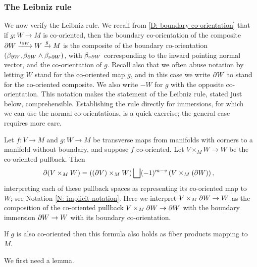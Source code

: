 \subsubsection{The Leibniz rule}

We now verify the Leibniz rule.
We recall from \cref{D: boundary co-orientation} that if $g \colon W \to M$ is co-oriented, then the boundary co-orientation of the composite $\partial W \xrightarrow{i_{\partial W}} W \xrightarrow{g} M$ is the composite of the boundary co-orientation $(\beta_{\partial W}, \beta_{\partial W} \wedge \beta_{\nu \partial W})$, with $\beta_{\nu \partial W}$ corresponding to the inward pointing normal vector, and the co-orientation of $g$.
Recall also that we often abuse notation by letting $W$ stand for the co-oriented map $g$, and in this case we write $\partial W$ to stand for the co-oriented composite.
We also write $-W$ for $g$ with the opposite co-orientation.
This notation makes the statement of the Leibniz rule, stated just below, comprehensible.
Establishing the rule directly for immersions, for which we can use the normal co-orientations, is a quick exercise; the general case requires more care.


\begin{proposition}\label{leibniz}
	Let $f \colon V \to M$ and $g \colon W \to M$ be transverse maps from manifolds with corners to a manifold without boundary, and suppose $f$ co-oriented.
	Let $V \times_M W \to W$ be the co-oriented pullback.
	Then
	$$\partial (V \times_M W) = \left((\partial V) \times_M W\right) \bigsqcup (-1)^{m-v} \left(V \times_M (\partial W)\right),$$
	interpreting each of these pullback spaces as representing its co-oriented map to $W$; see Notation \ref{N: implicit notation}. Here we interpret $V \times_M \partial W \to W$ as the composition of the co-oriented pullback $V \times_M \partial W \to \partial W$ with the boundary immersion $\partial W \to W$ with its boundary co-orientation.

	If $g$ is also co-oriented then this formula also holds as fiber products mapping to $M$.
\end{proposition}


We first need a lemma.


